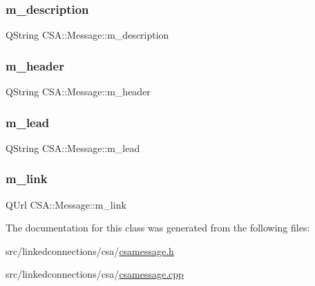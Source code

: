 \subsubsection{\texorpdfstring{m\+\_\+description}{m\_description}}
{\footnotesize\ttfamily Q\+String C\+S\+A\+::\+Message\+::m\+\_\+description\hspace{0.3cm}{\ttfamily [private]}}

\mbox{\label{classCSA_1_1Message_a3c274902f4b87b5acd6e15e60d8909eb}} 
\subsubsection{\texorpdfstring{m\+\_\+header}{m\_header}}
{\footnotesize\ttfamily Q\+String C\+S\+A\+::\+Message\+::m\+\_\+header\hspace{0.3cm}{\ttfamily [private]}}

\mbox{\label{classCSA_1_1Message_a89d011c48a82f63384531d1af495ab79}} 
\subsubsection{\texorpdfstring{m\+\_\+lead}{m\_lead}}
{\footnotesize\ttfamily Q\+String C\+S\+A\+::\+Message\+::m\+\_\+lead\hspace{0.3cm}{\ttfamily [private]}}

\mbox{\label{classCSA_1_1Message_a8d8f7f50df05a4f0ae80e9cd40c4435b}} 
\subsubsection{\texorpdfstring{m\+\_\+link}{m\_link}}
{\footnotesize\ttfamily Q\+Url C\+S\+A\+::\+Message\+::m\+\_\+link\hspace{0.3cm}{\ttfamily [private]}}



The documentation for this class was generated from the following files\+:\begin{DoxyCompactItemize}
\item 
src/linkedconnections/csa/\mbox{\hyperlink{csamessage_8h}{csamessage.\+h}}\item 
src/linkedconnections/csa/\mbox{\hyperlink{csamessage_8cpp}{csamessage.\+cpp}}\end{DoxyCompactItemize}
